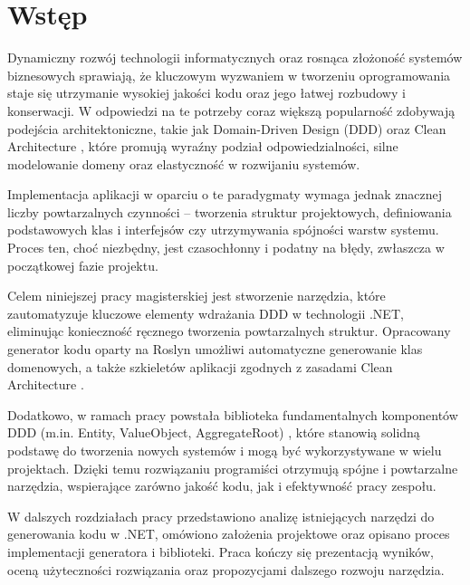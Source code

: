 \newpage
\section{Wstęp}
Dynamiczny rozwój technologii informatycznych oraz rosnąca złożoność systemów biznesowych sprawiają, że kluczowym wyzwaniem w tworzeniu oprogramowania staje się utrzymanie wysokiej jakości kodu oraz jego łatwej rozbudowy i konserwacji. W odpowiedzi na te potrzeby coraz większą popularność zdobywają podejścia architektoniczne, takie jak Domain-Driven Design (DDD) \cite{evans2004domain} oraz Clean Architecture \cite{unclebob2018cleanarchitecture}, które promują wyraźny podział odpowiedzialności, silne modelowanie domeny oraz elastyczność w rozwijaniu systemów.

Implementacja aplikacji w oparciu o te paradygmaty wymaga jednak znacznej liczby powtarzalnych czynności – tworzenia struktur projektowych, definiowania podstawowych klas i interfejsów czy utrzymywania spójności warstw systemu. Proces ten, choć niezbędny, jest czasochłonny i podatny na błędy, zwłaszcza w początkowej fazie projektu.

Celem niniejszej pracy magisterskiej jest stworzenie narzędzia, które zautomatyzuje kluczowe elementy wdrażania DDD w technologii .NET, eliminując konieczność ręcznego tworzenia powtarzalnych struktur. Opracowany generator kodu oparty na Roslyn \cite{microsoft2024roslyn} umożliwi automatyczne generowanie klas domenowych, a także szkieletów aplikacji zgodnych z zasadami Clean Architecture \cite{unclebob2018cleanarchitecture}.

Dodatkowo, w ramach pracy powstała biblioteka fundamentalnych komponentów DDD (m.in. Entity, ValueObject, AggregateRoot) \cite{evans2004domain}, które stanowią solidną podstawę do tworzenia nowych systemów i mogą być wykorzystywane w wielu projektach. Dzięki temu rozwiązaniu programiści otrzymują spójne i powtarzalne narzędzia, wspierające zarówno jakość kodu, jak i efektywność pracy zespołu.

W dalszych rozdziałach pracy przedstawiono analizę istniejących narzędzi do generowania kodu w .NET, omówiono założenia projektowe oraz opisano proces implementacji generatora i biblioteki. Praca kończy się prezentacją wyników, oceną użyteczności rozwiązania oraz propozycjami dalszego rozwoju narzędzia.